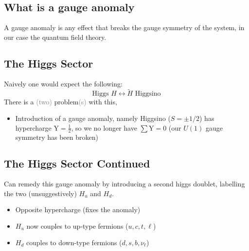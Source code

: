\documentclass{beamer}
\begin{document}
\subsection{What is a gauge anomaly}
\begin{frame}{\insertsubsection}
  \begin{definition}
  A gauge anomaly is \alert{any} effect that breaks the gauge symmetry of the system, in our case the
  quantum field theory.
  \end{definition}
\end{frame}

\subsection{The Higgs Sector}
\begin{frame}{\insertsubsection}
  Naively one would expect the following:
  \begin{equation*}
    \textrm{Higgs } H \leftrightarrow \tilde{H}\textrm{ Higgsino} 
  \end{equation*}
  There is a \textcolor{gray}{(two)} problem\textcolor{gray}{(s)} with this,
  \begin{itemize}
    \item Introduction of a gauge anomaly, namely Higgsino ($S=\pm1/2$) has hypercharge
    $\textrm{Y}=\frac{1}{2}$, so we no longer have $\sum\textrm{Y}=0$ (our
    $U(1)$ gauge symmetry has been broken)
  \end{itemize}
\end{frame}

\subsection{The Higgs Sector Continued}
\begin{frame}{\insertsubsection}
  Can remedy this gauge anomaly by introducing a second higgs doublet, labelling
  the two (unsuggestively) $H_{u}$ and $H_{d}$.
  \begin{itemize}
    \item Opposite hypercharge (fixes the anomaly)
    \item $H_{u}$ now couples to up-type fermions ($u,c,t,\ell$)
    \item $H_{d}$ couples to down-type fermions ($d,s,b,\nu_{\ell}$)
  \end{itemize}
\end{frame}
\end{document}
